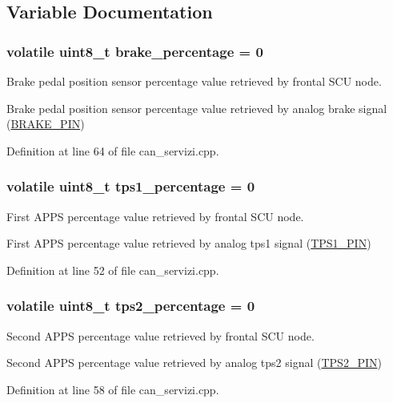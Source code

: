 \subsection{Variable Documentation}
\hypertarget{group___c_a_n__servizi__group_ga8e50a30864da7026531520887968d4c0}{
\subsubsection[{brake\-\_\-percentage}]{\setlength{\rightskip}{0pt plus 5cm}volatile uint8\-\_\-t brake\-\_\-percentage = 0}}\label{group___c_a_n__servizi__group_ga8e50a30864da7026531520887968d4c0}


Brake pedal position sensor percentage value retrieved by frontal S\-C\-U node. 

Brake pedal position sensor percentage value retrieved by analog brake signal (\hyperlink{group___board__model__group_gad632b56bf4c6259a390c3db91607078e}{B\-R\-A\-K\-E\-\_\-\-P\-I\-N}) 

Definition at line 64 of file can\-\_\-servizi.\-cpp.

\hypertarget{group___c_a_n__servizi__group_ga1d42f28ccf027a3243fad064fa47ef81}{
\subsubsection[{tps1\-\_\-percentage}]{\setlength{\rightskip}{0pt plus 5cm}volatile uint8\-\_\-t tps1\-\_\-percentage = 0}}\label{group___c_a_n__servizi__group_ga1d42f28ccf027a3243fad064fa47ef81}


First A\-P\-P\-S percentage value retrieved by frontal S\-C\-U node. 

First A\-P\-P\-S percentage value retrieved by analog tps1 signal (\hyperlink{group___board__model__group_gae9aa914854f611488701c96a330b0bd4}{T\-P\-S1\-\_\-\-P\-I\-N}) 

Definition at line 52 of file can\-\_\-servizi.\-cpp.

\hypertarget{group___c_a_n__servizi__group_gaf69d82f83885abc5adbd5fcbf4c421cf}{
\subsubsection[{tps2\-\_\-percentage}]{\setlength{\rightskip}{0pt plus 5cm}volatile uint8\-\_\-t tps2\-\_\-percentage = 0}}\label{group___c_a_n__servizi__group_gaf69d82f83885abc5adbd5fcbf4c421cf}


Second A\-P\-P\-S percentage value retrieved by frontal S\-C\-U node. 

Second A\-P\-P\-S percentage value retrieved by analog tps2 signal (\hyperlink{group___board__model__group_gab13a816bae3ca994897fc6f1cb590a67}{T\-P\-S2\-\_\-\-P\-I\-N}) 

Definition at line 58 of file can\-\_\-servizi.\-cpp.

